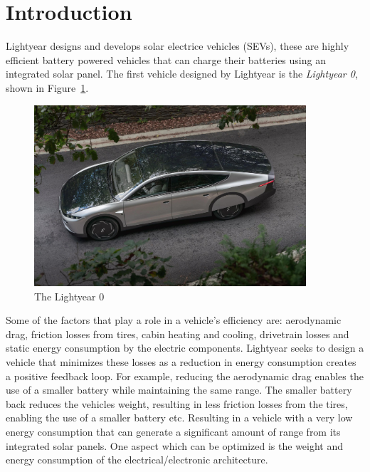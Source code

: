 \section{Introduction}
\label{sec:introduction}
Lightyear designs and develops solar electrice vehicles (SEVs), these are highly efficient battery powered vehicles that can charge their batteries using an integrated solar panel. The first vehicle designed by Lightyear is the \textit{Lightyear 0}, shown in Figure~\ref{fig:zero}.

\begin{figure}[htb]
    \centering
    \includegraphics[width=0.9\textwidth]{images/Lightyear_zero.jpg}
    \caption{The Lightyear 0}
    \label{fig:zero}
\end{figure}

Some of the factors that play a role in a vehicle's efficiency are: aerodynamic drag, friction losses from tires, cabin heating and cooling, drivetrain losses and static energy consumption by the electric components. Lightyear seeks to design a vehicle that minimizes these losses as a reduction in energy consumption creates a positive feedback loop. For example, reducing the aerodynamic drag enables the use of a smaller battery while maintaining the same range. The smaller battery back reduces the vehicles weight, resulting in less friction losses from the tires, enabling the use of a smaller battery etc. Resulting in a vehicle with a very low energy consumption that can generate a significant amount of range from its integrated solar panels. One aspect which can be optimized is the weight and energy consumption of the electrical/electronic architecture.

